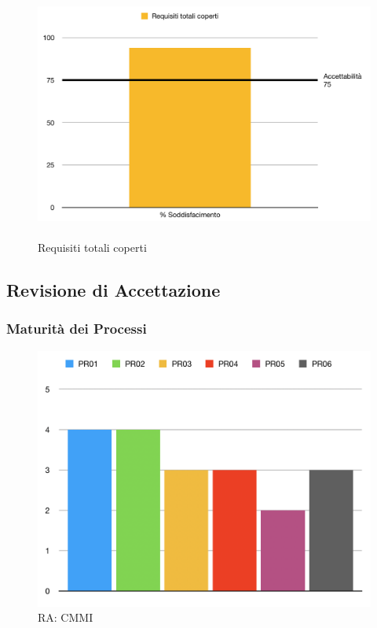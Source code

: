 \begin{minipage}[t]{0.25\textwidth}
	\begin{figure}[H]
		\includegraphics[scale=0.3]{./images/grafici_RQ/reqTotCop.png} 
		\caption{\-\\Requisiti totali coperti}
	\end{figure}
\end{minipage}

\pagebreak

\subsection{Revisione di Accettazione}
\label{RA_metriche}

\subsubsection{Maturità dei Processi} 
\begin{figure}[H]
	\begin{center}
	
		\includegraphics[scale=0.5]{./images/grafici_RA/CMMI.png} 
		\caption{RA: CMMI}
		
	\end{center}
	\end{figure}

